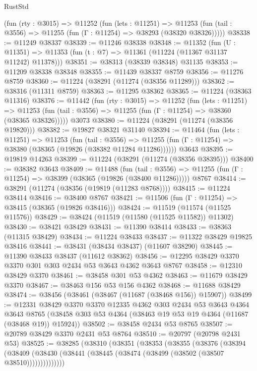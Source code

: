 \begin{lexlean}{RustStd}
\begin{coremodule}
    (fun (rty : @3015) =>
    @11252
      (fun (lets : @11251) =>
      @11253 (fun (tail : @3556) => @11255 (fun (Γ : @11254) => @38293 (@38320 @38326)))))
@38338 := @11249 @38337
@38339 := @11246 @38338
@38348 := @11352
    (fun (U : @11351) => @11353 (fun (t : @7) => @11361 (@11224 (@11367 @31137 @11242) @11378)))
@38351 := @38313 (@38339 @38348) @31135
@38353 := @11209 @38338 @38348
@38355 := @11439 @38337 @8759
@38356 := @11276 @8759
@38360 := @11224 (@38291 (@11274 (@38356 @11289)))
@38362 := @38316 (@11311 @8759)
@38363 := @11295 @38362
@38365 := @11224 (@38363 @11316)
@38376 := @11442
    (fun (rty : @3015) =>
    @11252
      (fun (lets : @11251) =>
      @11253 (fun (tail : @3556) => @11255 (fun (Γ : @11254) => @38360 (@38365 @38326)))))
    @3073
@38380 := @11224 (@38291 (@11274 (@38356 @19820)))
@38382 := @19827 @38321 @31140
@38394 := @11464
    (fun (lets : @11251) =>
    @11253
      (fun (tail : @3556) =>
      @11255 (fun (Γ : @11254) => @38380 (@38365 (@19826 (@38382 @11284 @11286))))))
    @3643
@38395 := @19819 @14263
@38399 := @11224 (@38291 (@11274 (@38356 @38395)))
@38400 := @38382 @3643
@38409 := @11488
    (fun (tail : @3556) => @11255 (fun (Γ : @11254) => @38399 (@38365 (@19826 (@38400 @11286)))))
    @8767
@38414 := @38291 (@11274 (@38356 (@19819 (@11283 @8768))))
@38415 := @11224 @38414
@38416 := @38400 @8767
@38421 := @11506 (fun (Γ : @11254) => @38415 (@38365 (@19826 @38416)))
@38424 := @11519 (@11574 (@11525 @11576))
@38429 := @38424 (@11519 (@11580 (@11525 @11582)) @11302)
@38430 := @38421 @38429
@38431 := @11390 @38414
@38433 := @38363 (@11315 @38429)
@38434 := @11224 @38433
@38437 := @11322 @38429 @19825 @38416
@38441 := @38431 (@38434 @38437) (@11607 @38290)
@38445 := @11390 @38433 @38437 (@11612 @38362)
@38456 := @12295 @38429 @3370 @3370 @301 @303 @2434 @53 @3643 @4362 @3643 @8767
@38458 := @12310 @38429 @3370
@38461 := @38458 @301 @53 @4362
@38463 := @11679 @38429 @3370
@38467 := @38463 @156 @53 @156 @4362
@38468 := @11688 @38429
@38474 := @38456 (@38461 (@38467 (@11687 (@38468 @156)) @15907))
@38499 := @12331
    @38429
    @3370
    @3370
    @12335
    @4362
    @303
    @2434
    @53
    @3643
    @4364
    @3643
    @8765
    (@38458 @303 @53 @4364 (@38463 @19 @53 @19 @4364 (@11687 (@38468 @19)) @15924))
@38502 := @38458 @2434 @53 @8765
@38507 := @20789 @38429 @3370 @2431 @53 @8764
@38510 := @20797 (@20798 @2431 @53)
@38525 := @38285
    (@38310
      (@38351
        (@38353
          (@38355
            (@38376
              (@38394
                (@38409 (@38430 (@38441 (@38445 (@38474 (@38499 (@38502 (@38507 @38510))))))))))))))

\end{coremodule}
\end{lexlean}
